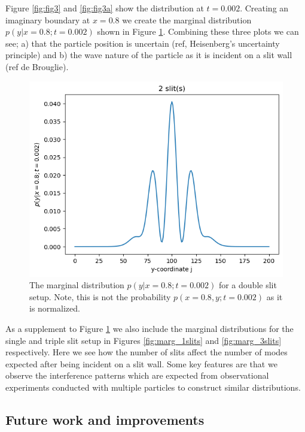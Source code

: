 \documentclass[../main_proj5.tex]{subfiles}
\begin{document}
Figure \ref{fig:fig3} and \ref{fig:fig3a} show the distribution at $t=0.002$. Creating an imaginary boundary at $x=0.8$ we create the marginal distribution $p(y|x=0.8; t=0.002)$ shown in Figure \ref{fig:marg_2slits}. Combining these three plots we can see; a) that the particle position is uncertain (ref, Heisenberg's uncertainty principle) and  b) the wave nature of the particle as it is incident on a slit wall (ref de Brouglie). 

\begin{figure}[h!]
    \centering
    \includegraphics[width=0.8\linewidth]{Project 5/figures/marg_distribution_x08_t0002_Nslits2.png}
    \caption{The marginal distribution $p(y|x=0.8; t=0.002)$ for a double slit setup. Note, this is not the probability $p(x=0.8,y; t=0.002)$ as it is normalized. }
    \label{fig:marg_2slits}
\end{figure}

As a supplement to Figure \ref{fig:marg_2slits} we also include the marginal distributions for the single and triple slit setup in Figures \ref{fig:marg_1slits} and \ref{fig:marg_3slits} respectively. Here we see how the number of slits affect the number of modes expected after being incident on a slit wall. Some key features are that we observe the interference patterns which are expected from observational experiments conducted with multiple particles to construct similar distributions.

\subsection{Future work and improvements}\label{sec:future_work}
\end{document}
